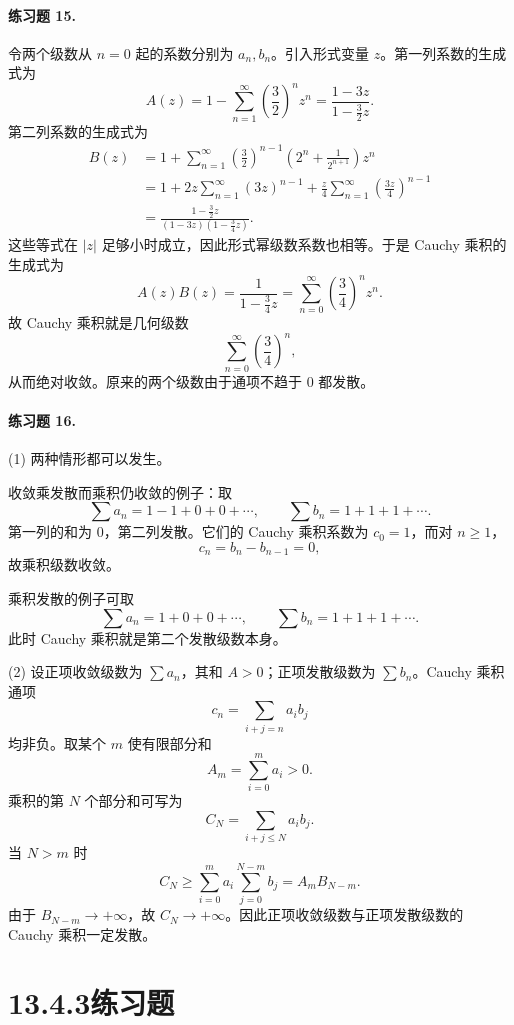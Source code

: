 \paragraph{练习题 15.}
\begin{xsolution}
令两个级数从 $n=0$ 起的系数分别为 $a_n,b_n$。引入形式变量 $z$。第一列系数的生成式为
\[
 A(z)=1-\sum_{n=1}^{\infty}\left(\frac32\right)^nz^n
 =\frac{1-3z}{1-\frac32z}.
\]
第二列系数的生成式为
\[
 \begin{aligned}
 B(z)
 &=1+\sum_{n=1}^{\infty}\left(\frac32\right)^{n-1}
 \left(2^n+\frac1{2^{n+1}}\right)z^n\\
 &=1+2z\sum_{n=1}^{\infty}(3z)^{n-1}
 +\frac z4\sum_{n=1}^{\infty}\left(\frac{3z}{4}\right)^{n-1}\\
 &=\frac{1-\frac32z}{(1-3z)(1-\frac34z)}.
 \end{aligned}
\]
这些等式在 $|z|$ 足够小时成立，因此形式幂级数系数也相等。于是 Cauchy 乘积的生成式为
\[
 A(z)B(z)=\frac1{1-\frac34z}
 =\sum_{n=0}^{\infty}\left(\frac34\right)^nz^n.
\]
故 Cauchy 乘积就是几何级数
\[
 \sum_{n=0}^{\infty}\left(\frac34\right)^n,
\]
从而绝对收敛。原来的两个级数由于通项不趋于 $0$ 都发散。
\end{xsolution}

\paragraph{练习题 16.}
\begin{xsolution}
(1) 两种情形都可以发生。

收敛乘发散而乘积仍收敛的例子：取
\[
 \sum a_n=1-1+0+0+\cdots,
 \qquad
 \sum b_n=1+1+1+\cdots.
\]
第一列的和为 $0$，第二列发散。它们的 Cauchy 乘积系数为 $c_0=1$，而对 $n\geq1$，
\[
 c_n=b_n-b_{n-1}=0,
\]
故乘积级数收敛。

乘积发散的例子可取
\[
 \sum a_n=1+0+0+\cdots,
 \qquad
 \sum b_n=1+1+1+\cdots.
\]
此时 Cauchy 乘积就是第二个发散级数本身。

(2) 设正项收敛级数为 $\sum a_n$，其和 $A>0$；正项发散级数为 $\sum b_n$。Cauchy 乘积通项
\[
 c_n=\sum_{i+j=n}a_ib_j
\]
均非负。取某个 $m$ 使有限部分和
\[
 A_m=\sum_{i=0}^{m}a_i>0.
\]
乘积的第 $N$ 个部分和可写为
\[
 C_N=\sum_{i+j\leq N}a_ib_j.
\]
当 $N>m$ 时
\[
 C_N\geq\sum_{i=0}^{m}a_i\sum_{j=0}^{N-m}b_j
 =A_mB_{N-m}.
\]
由于 $B_{N-m}\to+\infty$，故 $C_N\to+\infty$。因此正项收敛级数与正项发散级数的 Cauchy 乘积一定发散。
\end{xsolution}

\section*{13.4.3\quad 练习题}

